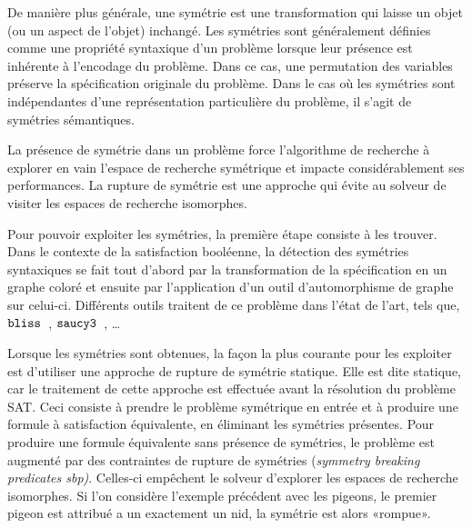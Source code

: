 De manière plus  générale, une symétrie est une transformation qui laisse un objet (ou un aspect de l'objet) inchangé. Les symétries sont généralement définies comme une propriété syntaxique d'un problème lorsque leur présence est inhérente à l'encodage du problème.
Dans ce cas, une permutation des variables préserve la spécification originale du problème.
Dans le cas où les symétries sont indépendantes d'une représentation particulière du problème, il s'agit de symétries sémantiques.


La présence de symétrie dans un problème force l'algorithme de recherche à explorer en vain l'espace de recherche symétrique et impacte considérablement ses performances.  La rupture de symétrie est une approche qui évite au solveur de visiter les espaces de recherche isomorphes.

Pour pouvoir exploiter les symétries, la première étape consiste à les trouver. Dans le contexte de la satisfaction booléenne, la détection des symétries syntaxiques se fait tout d'abord par la transformation de la spécification en un graphe coloré et ensuite par l'application d'un outil d'automorphisme de graphe sur celui-ci.
Différents outils traitent de ce problème dans l'état de l'art, tels que, $\texttt{bliss}$~\cite{JunttilaKaski:ALENEX2007}, $\texttt{saucy3}$~\cite{katebi2010symmetry}, …


Lorsque les symétries sont obtenues, la façon la plus courante pour les exploiter est d'utiliser une approche de rupture de symétrie statique. Elle est dite statique, car le traitement de cette approche  est effectuée avant la résolution du problème SAT.
Ceci consiste à prendre le problème symétrique en entrée et à produire une formule à satisfaction équivalente, en éliminant les symétries présentes. %
Pour produire une formule équivalente sans présence de symétries, le problème est augmenté par des 
contraintes de rupture de  symétries  (\textit{symmetry breaking predicates sbp)}.
 Celles-ci empêchent le solveur d'explorer les espaces de recherche isomorphes. 
Si l'on considère l'exemple précédent avec les pigeons, le premier pigeon est attribué a un
exactement un nid, la symétrie est alors «rompue».


